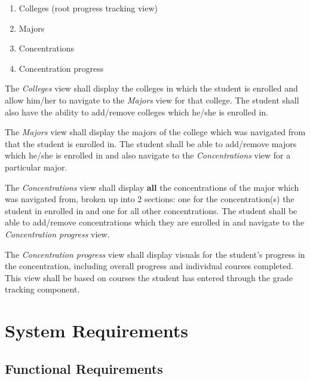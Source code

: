 \documentclass[12pt]{article}
\begin{document}
\begin{enumerate}
    \item Colleges (root progress tracking view)
    \item Majors
    \item Concentrations
    \item Concentration progress
\end{enumerate}

The \textit{Colleges} view shall display the colleges in which the student is enrolled and allow
him/her to navigate to the \textit{Majors} view for that college. The student shall also have the
ability to add/remove colleges which he/she is enrolled in.

The \textit{Majors} view shall display the majors of the college which was navigated from that the
student is enrolled in. The student shall be able to add/remove majors which he/she is enrolled in
and also navigate to the \textit{Concentrations} view for a particular major.

The \textit{Concentrations} view shall display \textbf{all} the concentrations of the major which
was navigated from, broken up into 2 sections: one for the concentration(s) the student in enrolled
in and one for all other concentrations. The student shall be able to add/remove concentrations
which they are enrolled in and navigate to the \textit{Concentration progress} view.

The \textit{Concentration progress} view shall display visuals for the student's progress in the
concentration, including overall progress and individual courses completed. This view shall be based
on courses the student has entered through the grade tracking component.

\section{System Requirements}
\subsection{Functional Requirements}

\newcommand{\sysshall}{The system shall }
\newcommand{\stushall}{The student shall }
\newcommand{\usershall}{The user shall }
\newcommand{\loginpage}{\sysshall display the login page.}
\newcommand{\mainmenu}{\sysshall display the main menu.}
\newcommand{\clickmainmenu}{\stushall click the \textbf{Main Menu} button}
\newcommand{\redirecthome}{\sysshall redirect the student to the homepage.}
\newcommand{\gotohome}{
    \item \clickmainmenu
    \item \mainmenu
}
\end{document}
